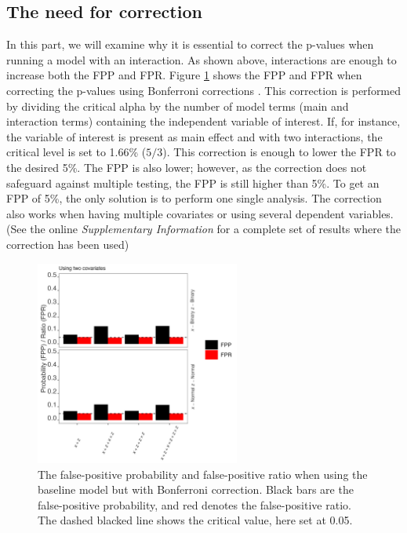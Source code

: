 \subsection{The need for correction}
In this part, we will examine why it is essential to correct the p-values when running a model with an interaction. As shown above, interactions are enough to increase both the FPP and FPR. Figure \ref{fig:mainfigure1_bon} shows the FPP and FPR when correcting the p-values using Bonferroni corrections \citep{dunn1961multiple}. This correction is performed by dividing the critical alpha by the number of model terms (main and interaction terms) containing the independent variable of interest. If, for instance, the variable of interest is present as main effect and with two interactions, the critical level is set to 1.66\% ($5/3$). This correction is enough to lower the FPR to the desired 5\%. The FPP is also lower; however, as the correction does not safeguard against multiple testing, the FPP is still higher than 5\%. To get an FPP of 5\%, the only solution is to perform one single analysis. The correction also works when having multiple covariates or using several dependent variables. (See the online \textit{Supplementary Information} for a complete set of results where the correction has been used)

\begin{figure}[hbt!]
\includegraphics[width=0.6\textwidth]{R/Analysis/Result/Figures/Figure1ABon_with.jpeg}
\centering
\caption{The false-positive probability and false-positive ratio when using the baseline model but with Bonferroni correction. Black bars are the false-positive probability, and red denotes the false-positive ratio. The dashed blacked line shows the critical value, here set at 0.05.}
\label{fig:mainfigure1_bon}
\end{figure}

